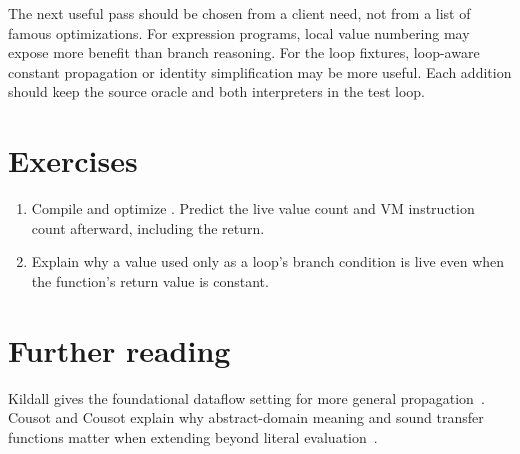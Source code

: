 The next useful pass should be chosen from a client need, not from a list of famous optimizations.
For expression programs, local value numbering may expose more benefit than branch reasoning.
For the loop fixtures, loop-aware constant propagation or identity simplification may be more useful.
Each addition should keep the source oracle and both interpreters in the test loop.

\section{Exercises}
\label{sec:pebble-fourteen-exercises}
\begin{enumerate}
\item \label{ex:pebble-fold-count} Compile and optimize . Predict the live value count and VM instruction count afterward, including the return.
\item \label{ex:pebble-root} Explain why a value used only as a loop's branch condition is live even when the function's return value is constant.
\end{enumerate}

\section{Further reading}
\label{sec:pebble-fourteen-reading}
Kildall gives the foundational dataflow setting for more general propagation~\cite{kildall-1973-dataflow}.
Cousot and Cousot explain why abstract-domain meaning and sound transfer functions matter when extending beyond literal evaluation~\cite{cousot-1977-abstract}.
